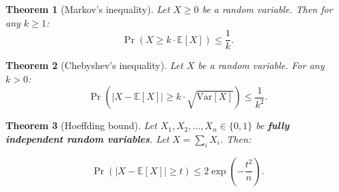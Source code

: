 \documentclass[12pt]{uebung}
\newtheorem{theorem}{Theorem}
\begin{document}
\newpage

\begin{theorem}[Markov's inequality]
Let $X \ge 0$ be a random variable. Then for any $k\ge1$:
$$\Pr( X \ge k \cdot \mathbb{E}[X] ) \le \frac{1}{k}.$$
\end{theorem}

\begin{theorem}[Chebyshev's inequality]
Let $X$ be a random variable. For any $k > 0$:
$$\Pr( |X - \mathbb{E}[X]| \ge k \cdot \sqrt{\mathrm{Var}[X]} ) \le \frac{1}{k^2}. $$
\end{theorem}

\begin{theorem}[Hoeffding bound]
Let $X_1,X_2,\ldots,X_n \in \{0,1\}$ be \textbf{fully independent random variables}. Let $X = \sum_i X_i$. Then:

$$\Pr( |X - \mathbb{E}[X]| \ge t) \le 2 \exp(- \frac{t^2}{n}).$$
\end{theorem}
\end{document}
